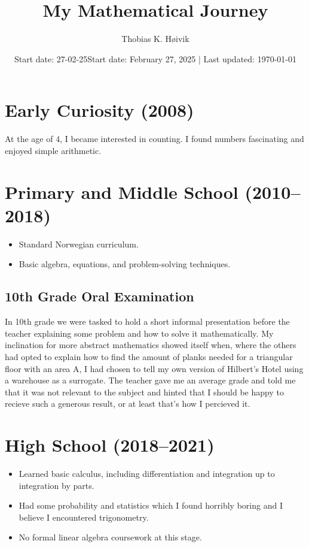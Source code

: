 \documentclass{article}
\title{My Mathematical Journey}
\author{Thobias K. Høivik}
\date{Start date: 27-02-25}
\date{Start date: February 27, 2025 | Last updated: \today}
\begin{document}
\maketitle

\section{Early Curiosity (2008)}
At the age of 4, I became interested in counting. I found numbers fascinating and enjoyed simple arithmetic.

\section{Primary and Middle School (2010--2018)}
\begin{itemize}
    \item Standard Norwegian curriculum.
    \item Basic algebra, equations, and problem-solving techniques.
\end{itemize}
\subsection*{10th Grade Oral Examination}
In 10th grade we were tasked to hold a short informal presentation before the teacher explaining some problem and how to solve it mathematically. 
My inclination for more abstract mathematics showed itself when, where the others had opted to explain how to find the amount of planks needed for a triangular floor with an area A, I had chosen to tell my own version of Hilbert's Hotel using a warehouse as a surrogate.
The teacher gave me an average grade and told me that it was not relevant to the subject and hinted that I should be happy to recieve such a generous result, or at least that's how I percieved it.

\break
\section{High School (2018--2021)}
\begin{itemize}
    \item Learned basic calculus, including differentiation and integration up to integration by parts.
    \item Had some probability and statistics which I found horribly boring and I believe I encountered trigonometry.
    \item No formal linear algebra coursework at this stage.
\end{itemize}
\end{document}
